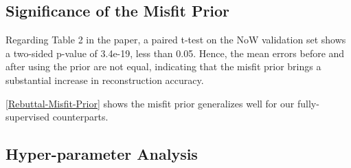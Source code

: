 \documentclass[10pt,twocolumn,letterpaper]{article}
\begin{document}
 \subsection{Significance of the Misfit Prior}

Regarding Table 2 in the paper, a paired t-test on the NoW validation set shows a two-sided p-value of 3.4e-19, less than 0.05.
Hence, the mean errors before and after using the prior are not equal, indicating that the misfit prior brings a substantial increase in reconstruction accuracy.

\cref{Rebuttal-Misfit-Prior} shows the misfit prior generalizes well for our fully-supervised counterparts.

\begin{table}
  \caption{Reconstruction error (mm) on NoW validation subsets.} 
    \vspace{-.3cm}
  \label{Rebuttal-Misfit-Prior}
  \centering
\end{table}


 

\subsection{Hyper-parameter Analysis}
\end{document}
